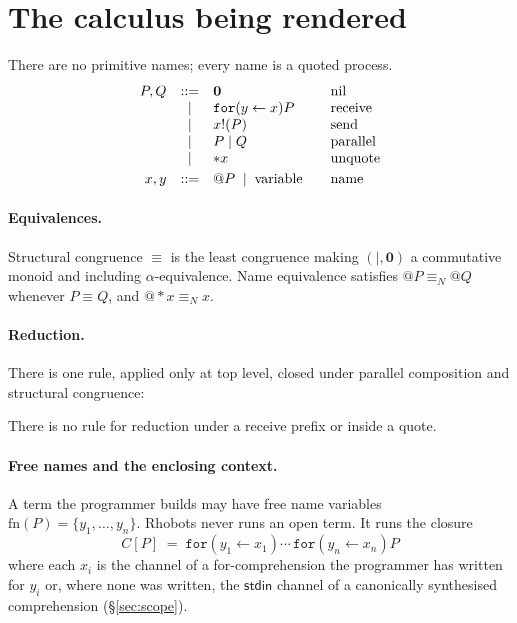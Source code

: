 \documentclass[11pt]{article}
\makeatletter
\newcommand{\rhonil}{\mathbf{0}}
\newcommand{\recv}[3]{\mathtt{for}(#1 \leftarrow #2)#3}
\newcommand{\send}[2]{#1!(#2)}
\newcommand{\quot}[1]{@#1}
\newcommand{\drop}[1]{{*}#1}
\newcommand{\eqN}{\equiv_{N}}
\makeatother
\begin{document}
\section{The calculus being rendered}\label{sec:calculus}

There are no primitive names; every name is a quoted process.
\[
\begin{array}{rcl@{\qquad}l}
P,Q & ::= & \rhonil & \text{nil}\\
    & \mid & \recv{y}{x}{P} & \text{receive}\\
    & \mid & \send{x}{P} & \text{send}\\
    & \mid & P \mid Q & \text{parallel}\\
    & \mid & \drop{x} & \text{unquote}\\[1mm]
x,y & ::= & \quot{P} \;\mid\; \text{variable} & \text{name}
\end{array}
\]

\paragraph{Equivalences.} Structural congruence $\equiv$ is the least congruence making
$(\mid, \rhonil)$ a commutative monoid and including $\alpha$-equivalence. Name equivalence
satisfies $\quot{P} \eqN \quot{Q}$ whenever $P \equiv Q$, and $\quot{\drop{x}} \eqN x$.

\paragraph{Reduction.} There is one rule, applied only at top level, closed under
parallel composition and structural congruence:
There is no rule for reduction under a receive prefix or inside a quote.

\paragraph{Free names and the enclosing context.} A term the programmer builds may have free
name variables $\mathrm{fn}(P) = \{y_1, \dots, y_n\}$. Rhobots never runs an open term. It runs the
closure
\[
C[P] \;=\; \recv{y_1}{x_1}{\cdots\,\recv{y_n}{x_n}{P}}
\]
where each $x_i$ is the channel of a for-comprehension the programmer has written for $y_i$ or,
where none was written, the $\mathsf{stdin}$ channel of a canonically synthesised comprehension
(\S\ref{sec:scope}).
\end{document}
